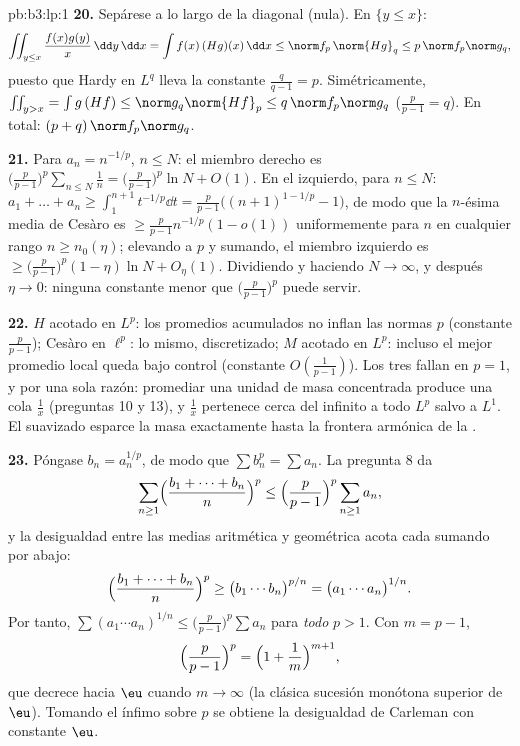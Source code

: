 \begin{solution}{pb:b3:lp:1}
\textbf{20.} Sepárese a lo largo de la diagonal (nula). En $\{y \leq
x\}$:
\[
\iint_{y\leq x}\frac{f(x)g(y)}{x}\,\dd y\,\dd x
= \int f(x)\,(Hg)(x)\,\dd x \leq \norm f_p\,\norm{Hg}_q
\leq p\,\norm f_p\norm g_q,
\]
puesto que Hardy en $L^q$ lleva la constante $\frac q{q-1} =
p$. Simétricamente, $\iint_{y>x} = \int g\,(Hf) \leq
\norm g_q\norm{Hf}_p \leq q\,\norm f_p\norm g_q$ ($\frac
p{p-1} = q$). En total: $(p + q)\,\norm f_p\norm g_q$.

\textbf{21.} Para $a_n = n^{-1/p}$, $n \leq N$: el miembro derecho es
$\bigl(\frac p{p-1}\bigr)^p\sum_{n\leq N}\frac1n =
\bigl(\frac p{p-1}\bigr)^p\ln N + O(1)$. En el izquierdo, para $n
\leq N$: $a_1 + \dots + a_n \geq \int_1^{n+1}t^{-1/p}\dd t =
\frac{p}{p-1}\bigl((n+1)^{1-1/p} - 1\bigr)$, de modo que la $n$-ésima
media de Cesàro es $\geq \frac p{p-1}n^{-1/p}(1 -
o(1))$ uniformemente para $n$ en cualquier rango $n \geq n_0(\eta)$;
elevando a $p$ y sumando, el miembro izquierdo es $\geq
\bigl(\frac p{p-1}\bigr)^p(1 - \eta)\ln N + O_\eta(1)$. Dividiendo y
haciendo $N \to \infty$, y después $\eta \to 0$: ninguna constante menor
que $\bigl(\frac p{p-1}\bigr)^p$ puede servir.

\textbf{22.} $H$ acotado en $L^p$: los promedios acumulados no inflan
las normas $p$ (constante $\frac p{p-1}$); Cesàro en $\ell^p$: lo mismo,
discretizado; $M$ acotado en $L^p$: incluso el mejor promedio local
queda bajo control (constante $O(\frac1{p-1})$). Los tres fallan en
$p = 1$, y por una sola razón: promediar una unidad de masa concentrada
produce una cola $\frac1x$ (preguntas 10 y 13), y $\frac1x$ pertenece
cerca del infinito a todo $L^p$ salvo a $L^1$. El suavizado esparce la
masa exactamente hasta la frontera armónica de la
.

\textbf{23.} Póngase $b_n = a_n^{1/p}$, de modo que $\sum b_n^p = \sum
a_n$. La pregunta 8 da
\[
\sum_{n\geq1}\Bigl(\frac{b_1 + \dots + b_n}n\Bigr)^{p}
\leq \Bigl(\frac p{p-1}\Bigr)^{p}\sum_{n\geq1}a_n,
\]
y la desigualdad entre las medias aritmética y geométrica acota cada
sumando por abajo:
\[
\Bigl(\frac{b_1 + \dots + b_n}n\Bigr)^{p}
\geq \bigl(b_1\cdots b_n\bigr)^{p/n}
= \bigl(a_1\cdots a_n\bigr)^{1/n}.
\]
Por tanto, $\sum(a_1\cdots a_n)^{1/n} \leq \bigl(\frac
p{p-1}\bigr)^p\sum a_n$ para \emph{todo} $p > 1$. Con $m =
p - 1$,
\[
\Bigl(\frac p{p-1}\Bigr)^{p} =
\Bigl(1 + \frac1m\Bigr)^{m+1},
\]
que decrece hacia $\eu$ cuando $m \to \infty$ (la clásica sucesión
monótona superior de $\eu$). Tomando el ínfimo sobre $p$ se obtiene la
desigualdad de Carleman con constante $\eu$.


\end{solution}
